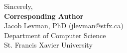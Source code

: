 \documentclass[10pt,a4paper]{article}
\begin{document}





\bigskip

\noindent
Sincerely, \\

\small
\noindent
\textbf{Corresponding Author}\\
Jacob Levman, PhD (jlevman@stfx.ca) \\
Department of Computer Science \\
St. Francis Xavier University \\
\end{document}
